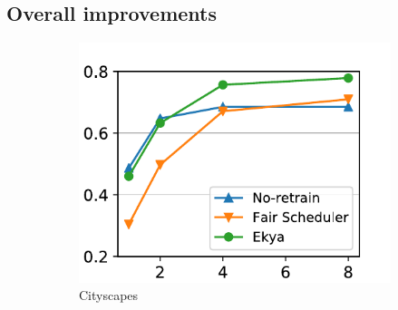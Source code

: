 


\subsection{Overall improvements}

\begin{figure}
  \centering
  \begin{subfigure}[t]{0.5\linewidth}
    \centering
    \includegraphics[width=\linewidth]{results/multicam/cityscapes_across_resources.pdf} 
    \caption{\small Cityscapes}
    \label{fig:scalability-gpus-cityscapes-golden}
  \end{subfigure}
  ~~~
  \begin{subfigure}[t]{0.5\linewidth}
    \centering

\end{subfigure}
\end{figure}
